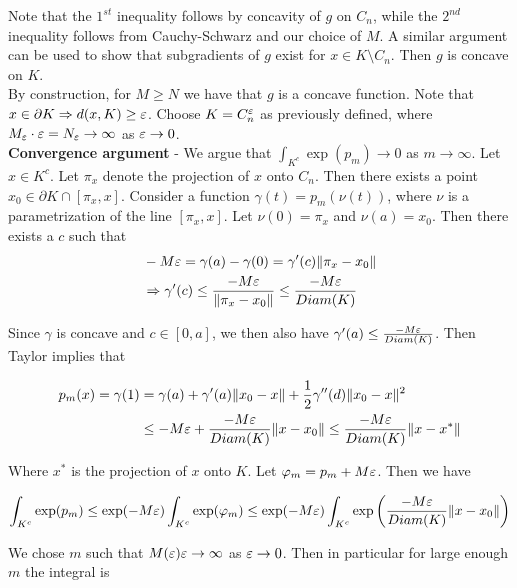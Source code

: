 \documentclass[11pt,reqno]{amsart}
\numberwithin{equation}{section}
\newcommand{\lft}{\left(}
\newcommand{\rt}{\right)}
\newcommand{\tb}{\textbf}
\newcommand{\pa}{\partial}
\begin{document}
Note that the $1^{st}$ inequality follows by concavity of $g$ on $C_n$, while the $2^{nd}$ inequality follows from Cauchy-Schwarz and our choice of $M$. A similar argument can be used to show that subgradients of $g$ exist for $x \in K \setminus C_n$. Then $g$ is concave on $K$. \\

By construction, for $M \geq N$ we have that $g$ is a concave function. Note that $x \in \pa K \implies d(x,K) \geq \eps$. Choose $K = C_n^{\varepsilon}$ as previously defined, where $M_{\varepsilon} \cdot \varepsilon = N_{\varepsilon} \rightarrow \infty$ as $\varepsilon \rightarrow 0$.\\

\tb{Convergence argument} - We argue that $\int_{K^c} \exp(p_m) \to 0$ as $m \to \infty$. Let $x \in K^c$. Let $\pi_x$ denote the projection of $x$ onto $C_n$. Then there exists a point $x_0 \in \pa K \cap [\pi_x, x]$. Consider a function $\gamma(t) = p_m(\nu(t))$, where $\nu$ is a parametrization of the line $[\pi_x, x]$. Let $\nu(0) = \pi_x$ and $\nu(a) = x_0$. Then there exists a $c$ such that \\

\begin{align*}
&-M \varepsilon = \gamma(a) - \gamma(0) = \gamma'(c) \|\pi_x - x_0\|\\
&\Rightarrow \gamma'(c) \leq \frac{-M \varepsilon}{\|\pi_x - x_0\|} \leq \frac{-M \varepsilon}{Diam(K)} 
\end{align*}

Since $\gamma$ is concave and $c \in [0,a]$, we then also have $\gamma'(a) \leq \frac{-M \varepsilon}{Diam(K)}$. Then Taylor implies that 

\begin{align*}
p_m(x) = \gamma(1) &= \gamma(a) + \gamma'(a) \|x_0 - x\| + \frac{1}{2} \gamma''(d) \|x_0 - x\|^2\\
&\leq -M \varepsilon + \frac{-M \varepsilon}{Diam(K)} \|x - x_0\| \leq \frac{-M \varepsilon}{Diam(K)} \|x - x^*\|
\end{align*} 

Where $x^*$ is the projection of $x$ onto $K$. Let $\varphi_m = p_m + M \varepsilon $. Then we have 

\begin{align*}
\int_{K^c} \exp(p_m) \leq \exp(-M \eps) \int_{K^c} \exp(\phi_m) \leq \exp(-M \eps) \int_{K^c} \exp \lft \frac{-M \eps}{Diam(K)}\|x - x_0\| \rt 
\end{align*}

We chose $m$ such that $M(\varepsilon) \varepsilon \rightarrow \infty$ as $\varepsilon \rightarrow 0$. Then in particular for large enough $m$ the integral is 
\end{document}
